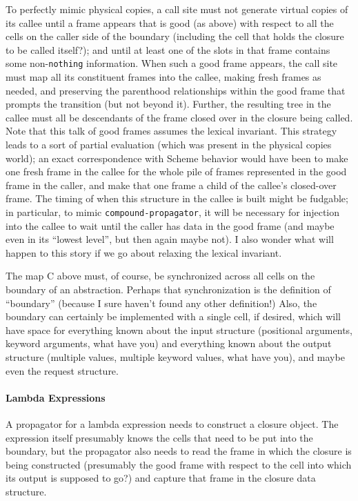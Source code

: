 \documentclass{article}
\newcommand{\code}[1]{{\tt #1}}
\begin{document}
To perfectly mimic physical copies, a call site must not generate
virtual copies of its callee until a frame appears that is good (as
above) with respect to all the cells on the caller side of the
boundary (including the cell that holds the closure to be called
itself?); and until at least one of the slots in that frame contains
some non-\code{nothing} information.
When such a good frame appears, the call site must map all
its constituent frames into the callee, making fresh frames as needed,
and preserving the parenthood relationships within the good frame that
prompts the transition (but not beyond it).  Further, the resulting
tree in the callee must all be descendants of the frame closed over in
the closure being called.  Note that this talk of good frames assumes
the lexical invariant.  This strategy leads to a sort of partial
evaluation (which was present in the physical copies world); an exact
correspondence with Scheme behavior would have been to make one fresh
frame in the callee for the whole pile of frames represented in the
good frame in the caller, and make that one frame a child of the
callee's closed-over frame.  The timing of when this structure in the
callee is built might be fudgable; in particular, to mimic
\code{compound-propagator}, it will be necessary for injection into
the callee to wait until the caller has data in the good frame (and
maybe even in its ``lowest level'', but then again maybe not).  I
also wonder what will happen to this story if we go about relaxing the
lexical invariant.

The map C above must, of course, be synchronized across all cells
on the boundary of an abstraction.  Perhaps that synchronization
is the definition of ``boundary'' (because I sure haven't found any
other definition!)  Also, the boundary can certainly be
implemented with a single cell, if desired, which will have space
for everything known about the input structure (positional
arguments, keyword arguments, what have you) and everything known
about the output structure (multiple values, multiple keyword
values, what have you), and maybe even the request structure.

\paragraph{Lambda Expressions}
A propagator for a lambda expression needs to construct a closure
object.  The expression itself presumably knows the cells that
need to be put into the boundary, but the propagator also needs to
read the frame in which the closure is being constructed
(presumably the good frame with respect to the cell into which
its output is supposed to go?) and capture that frame in the
closure data structure.
\end{document}
